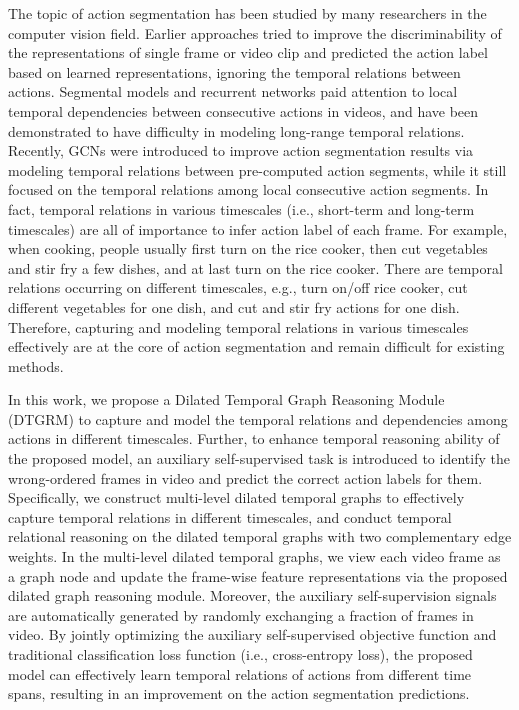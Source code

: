 \documentclass[letterpaper]{article} \usepackage{aaai21}  \usepackage{times}  \usepackage{helvet} \usepackage{courier}  \usepackage[hyphens]{url}  \usepackage{graphicx} \usepackage{mathtools}
\begin{document}
The topic of action segmentation has been studied by many researchers in the computer vision field. Earlier approaches \cite{rohrbach2012database,karaman2014fast,cheng2014temporal} tried to improve the discriminability of the representations of single frame or video clip and predicted the action label based on learned representations, ignoring the temporal relations between actions. Segmental models \cite{pirsiavash2014parsing,lea2016segmental} and recurrent networks \cite{huang2016connectionist,singh2016multi} paid attention to local temporal dependencies between consecutive actions in videos, and have been demonstrated to have difficulty in modeling long-range temporal relations. Recently, GCNs \cite{huang2020improving} were introduced to improve action segmentation results via modeling temporal relations between pre-computed action segments, while it still focused on the temporal relations among local consecutive action segments. In fact, temporal relations in various timescales (i.e., short-term and long-term timescales) are all of importance to infer action label of each frame. For example, when cooking, people usually first turn on the rice cooker, then cut vegetables and stir fry a few dishes, and at last turn on the rice cooker. There are temporal relations occurring on different timescales, e.g., turn on/off rice cooker, cut different vegetables for one dish, and cut and stir fry actions for one dish. Therefore, capturing and modeling temporal relations in various timescales effectively are at the core of action segmentation and remain difficult for existing methods.

In this work, we propose a Dilated Temporal Graph Reasoning Module (DTGRM) to capture and model the temporal relations and dependencies among actions in different timescales. Further, to enhance temporal reasoning ability of the proposed model, an auxiliary self-supervised task is introduced to identify the wrong-ordered frames in video and predict the correct action labels for them. Specifically, we construct multi-level dilated temporal graphs to effectively capture temporal relations in different timescales, and conduct temporal relational reasoning on the dilated temporal graphs with two complementary edge weights. In the multi-level dilated temporal graphs, we view each video frame as a graph node and update the frame-wise feature representations via the proposed dilated graph reasoning module. Moreover, the auxiliary self-supervision signals are automatically generated by randomly exchanging a fraction of frames in video. By jointly optimizing the auxiliary self-supervised objective function and traditional classification loss function (i.e., cross-entropy loss), the proposed model can effectively learn temporal relations of actions from different time spans, resulting in an improvement on the action segmentation predictions.
\end{document}
